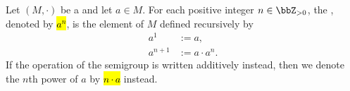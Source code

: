 \begin{definition} \label{definition:power_of_a_semigroup_element_by_a_positive_integer}
Let $(M,\cdot)$ be a  and let $a \in M$. For each positive integer $n \in \bbZ_{>0}$, the , denoted by \hl{$a^n$}, is the element of $M$ defined recursively by
\begin{align*}
    a^1 &:= a, \\
    a^{n+1} &:= a \cdot a^n.
\end{align*}
If the operation of the semigroup is written additively instead, then we denote the $n$th power of $a$ by \hl{$n \cdot a$} instead.
\end{definition}